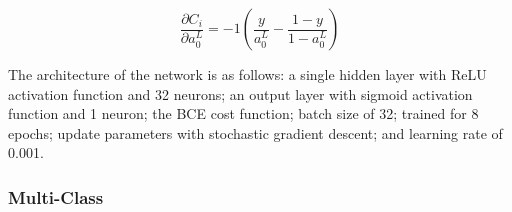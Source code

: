 \documentclass{article}
\begin{document}
\begin{equation}
	\frac{\partial C_i}{\partial a_{0}^{L}} = -1(\frac{y}{a_{0}^{L}} - \frac{ 1 - y}{ 1 - a_{0}^{L} })
\end{equation}

The architecture of the network is as follows: a single hidden layer with ReLU
activation function and 32 neurons; an output layer with sigmoid activation function
and 1 neuron; the BCE cost function; batch size of 32; trained for 8 epochs;
update parameters with stochastic gradient descent; and learning rate of 0.001.

\subsubsection{Multi-Class}

\pagebreak
\printbibliography
\end{document}
